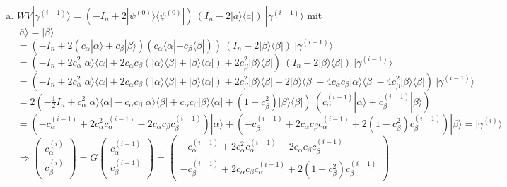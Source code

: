 \documentclass[a4paper]{scrartcl}
\begin{document}
\begin{enumerate}[a)]
\item $WV | \gamma^{(i-1)} \rangle = (-I_n +2 |\psi^{(0)} \rangle \langle \psi^{(0)} | ) ~ (I_n - 2 |\bar{a} \rangle \langle \bar{a}| ) ~ | \gamma^{(i-1)} \rangle$ mit $|\bar{a} \rangle = |\beta \rangle$\\
$= (-I_n +2 (c_{\alpha} |\alpha \rangle + c_{\beta} |\beta \rangle) (c_{\alpha} \langle \alpha| + c_{\beta} \langle \beta|) ) ~ (I_n - 2 | \beta \rangle \langle \beta| ) ~ | \gamma^{(i-1)} \rangle$\\
$= (-I_n +2 c_{\alpha}^2 |\alpha \rangle \langle \alpha| + 2 c_{\alpha} c_{\beta} ( |\alpha \rangle \langle \beta| + |\beta \rangle \langle \alpha|) + 2 c_{\beta}^2 |\beta \rangle \langle \beta| ) ~ (I_n - 2 | \beta \rangle \langle \beta| ) ~ | \gamma^{(i-1)} \rangle$\\
$= (-I_n +2 c_{\alpha}^2 |\alpha \rangle \langle \alpha| + 2c_{\alpha}c_{\beta} ( |\alpha \rangle \langle \beta| + |\beta \rangle \langle \alpha|) + 2c_{\beta}^2 |\beta \rangle \langle \beta| + 2 | \beta \rangle \langle \beta| - 4 c_{\alpha}c_{\beta} |\alpha \rangle \langle \beta| - 4 c_{\beta}^2 |\beta \rangle \langle \beta| ) ~ | \gamma^{(i-1)} \rangle$\\
$= 2(- \frac{1}{2}I_n + c_{\alpha}^2 |\alpha \rangle \langle \alpha| - c_{\alpha}c_{\beta} |\alpha \rangle \langle \beta| + c_{\alpha}c_{\beta} |\beta \rangle \langle \alpha| + (1 - c_{\beta}^2) |\beta \rangle \langle \beta|) ~ (c_{\alpha}^{(i-1)} |\alpha \rangle + c_{\beta}^{(i-1)} |\beta \rangle)$\\
$= (-c_{\alpha}^{(i-1)} + 2c_{\alpha}^2 c_{\alpha}^{(i-1)} - 2c_{\alpha}c_{\beta} c_{\beta}^{(i-1)}) |\alpha \rangle + (-c_{\beta}^{(i-1)} + 2c_{\alpha}c_{\beta} c_{\alpha}^{(i-1)} + 2(1 - c_{\beta}^2) c_{\beta}^{(i-1)} ) |\beta \rangle = | \gamma^{(i)} \rangle$\\

$\Rightarrow  \begin{pmatrix} c_{\alpha}^{(i)}\\ c_{\beta}^{(i)}\end{pmatrix} = G \begin{pmatrix} c_{\alpha}^{(i-1)}\\ c_{\beta}^{(i-1)}\end{pmatrix} \stackrel{!}{=} \begin{pmatrix}-c_{\alpha}^{(i-1)} + 2c_{\alpha}^2 c_{\alpha}^{(i-1)} - 2c_{\alpha}c_{\beta} c_{\beta}^{(i-1)} \\ -c_{\beta}^{(i-1)} + 2c_{\alpha}c_{\beta} c_{\alpha}^{(i-1)} + 2(1 - c_{\beta}^2) c_{\beta}^{(i-1)} \end{pmatrix}$\\


\end{enumerate}
\end{document}
